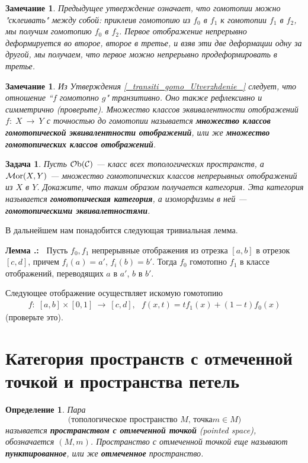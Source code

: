 \documentclass[12pt]{book}
\newcommand{\arrow}{{\:\longrightarrow\:}}
\newcommand{\Ob}{\operatorname{{\cal O}b}}
\newcommand{\Mor}{\operatorname{{\cal M}or}}
\newcommand{\cac}{{\cal C}}
\theoremstyle{upshape}
\newtheorem{zadacha}{Задача}[chapter]
\theoremstyle{generic}
\newtheorem{opredelenie}[teorema]{Определение}
\newtheorem{remark}[teorema]{Замечание}
\def\замечание{\begin{remark}}
\def\еза{\end{remark}}
\theoremstyle{upshapenonumber}
\newcommand{\следствие}{%
     \refstepcounter{teorema}
     {\noindent\bf Следствие \thechapter.\arabic{teorema}:\ }}
\newcommand{\пример}{%
     \refstepcounter{teorema}
     {\noindent\bf Пример \thechapter.\arabic{teorema}:\ }}
\newcommand{\лемма}{%
     \refstepcounter{teorema}
     {\noindent\bf Лемма \thechapter.\arabic{teorema}:\ }}
\newcommand{\теорема}{%
     \refstepcounter{teorema}
     {\noindent\bf Теорема \thechapter.\arabic{teorema}:\ }}
\newcommand{\утверждение}{%
     \refstepcounter{teorema}
     {\noindent\bf Утверждение \thechapter.\arabic{teorema}:\ }}
\def\хфилл{\hfill}
\def\бф{\bf}
\def\ем{\em}
\def\задача{\begin{zadacha}}
\def\ез{\end{zadacha}}
\def\еу{\end{ukazanie}}
\def\определение{\begin{opredelenie}}
\def\ео{\end{opredelenie}}
\def\енум{\begin{enumerate}}
\def\ее{\end{enumerate}}
\begin{document}
\замечание
Предыдущее утверждение означает, что гомотопии
можно "склеивать" между собой: приклеив
гомотопию из $f_0$ в $f_1$ к гомотопии $f_1$ в $f_2$,
мы получим гомотопию $f_0$ в $f_2$. Первое отображение
непрерывно деформируется во второе, второе в третье,
и взяв эти две деформации одну за другой, мы получаем,
что первое можно непрерывно продеформировать в третье.
\еза


\замечание
Из Утверждения
\ref{_transiti_gomo_Utverzhdenie_}
следует, что отношение ``$f$ гомотопно $g$" транзитивно.
Оно также рефлексивно и симметрично (проверьте).
Множество классов эквивалентности отображений
$f:\; X \arrow Y$  с точностью
до гомотопии
называется {\бф множество классов гомотопической
эквивалентности отображений}, или же {\бф множество
гомотопических классов отображений}.
\еза

\задача
Пусть $\Ob(\cac)$ --- класс всех топологических
пространств, а $\Mor(X,Y)$ --- множество гомотопических
классов непрерывных отображений из $X$ в $Y$. Докажите,
что таким образом получается категория. Эта категория
называется {\бф гомотопическая категория}, а изоморфизмы
в ней --- {\бф гомотопическими эквивалетностями}.
\ез



В дальнейшем нам понадобится следующая
тривиальная лемма.


\hfill

\лемма \label{_homo_fu_Lemma_}
Пусть $f_0, f_1$ непрерывные отображения
из отрезка $[a, b]$ в отрезок $[c, d]$, причем
$f_i(a) = a'$, $f_i(b)=b'$. Тогда $f_0$ гомотопно
$f_1$ в классе отображений, переводящих $a$ в $a'$,
$b$ в $b'$.

\хфилл

Следующее отображение осуществляет искомую гомотопию
\begin{align*}f:\; [a, b]\times [0,1]  \arrow [c,d],\ \ \ 
f(x, t) = t f_1(x) + (1-t) f_0(x)
\end{align*}
(проверьте это).



\section{Категория пространств с отмеченной точкой 
и пространства петель}


\определение
Пара
\[ \bigg(\text{топологическое пространство $M$, точка
$m\in M$}\bigg)
\]
называется {\бф пространством с отмеченной точкой}
(pointed space), обозначается
$(M,m)$. Пространство с отмеченной точкой еще называют
{\бф пунктированное}, или же {\бф отмеченное} пространство.
\ео
\end{document}
